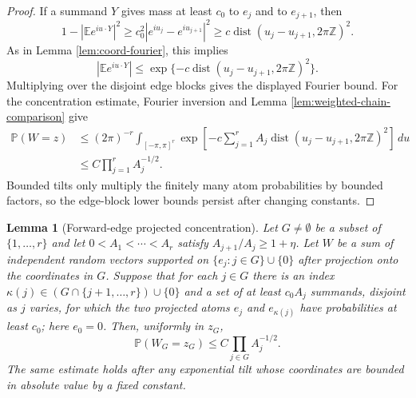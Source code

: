 \documentclass[11pt]{article}
\newtheorem{lemma}[theorem]{Lemma}
\theoremstyle{remark}
\newcommand{\Pp}{\mathbb P}
\newcommand{\Ee}{\mathbb E}
\newcommand{\dd}{\,d}
\begin{document}
\begin{proof}
If a summand $Y$ gives mass at least $c_0$ to $e_j$ and to $e_{j+1}$, then
\[
        1-|\Ee e^{iu\cdot Y}|^2
        \ge c_0^2|e^{iu_j}-e^{iu_{j+1}}|^2
        \ge c\operatorname{dist}(u_j-u_{j+1},2\pi\mathbb Z)^2 .
\]
As in Lemma \ref{lem:coord-fourier}, this implies
\[
        |\Ee e^{iu\cdot Y}|
        \le \exp\{-c\operatorname{dist}(u_j-u_{j+1},2\pi\mathbb Z)^2\}.
\]
Multiplying over the disjoint edge blocks gives the displayed Fourier bound.
For the concentration estimate, Fourier inversion and Lemma
\ref{lem:weighted-chain-comparison} give
\[
\begin{aligned}
        \Pp(W=z)
        &\le (2\pi)^{-r}\int_{[-\pi,\pi]^r}
        \exp\left[-c\sum_{j=1}^r A_j
        \operatorname{dist}(u_j-u_{j+1},2\pi\mathbb Z)^2\right]\dd u \\
        &\le C\prod_{j=1}^r A_j^{-1/2}.
\end{aligned}
\]
Bounded tilts only multiply the finitely many atom probabilities by bounded factors, so the edge-block lower bounds persist after changing constants.
\end{proof}

\begin{lemma}[Forward-edge projected concentration]\label{lem:projected-forward-edge-concentration}
Let $G\ne\emptyset$ be a subset of $\{1,\ldots,r\}$ and let
$0<A_1<\cdots<A_r$ satisfy $A_{j+1}/A_j\ge1+\eta$.
Let $W$ be a sum of independent random vectors supported on
$\{e_j:j\in G\}\cup\{0\}$ after projection onto the coordinates in $G$.
Suppose that for each $j\in G$ there is an index
$\kappa(j)\in (G\cap\{j+1,\ldots,r\})\cup\{0\}$ and a set of at
least $c_0A_j$ summands, disjoint as $j$ varies, for which the two
projected atoms $e_j$ and $e_{\kappa(j)}$ have probabilities at least
$c_0$; here $e_0=0$.  Then, uniformly in $z_G$,
\[
        \Pp(W_G=z_G)\le C\prod_{j\in G} A_j^{-1/2}.
\]
The same estimate holds after any exponential tilt whose coordinates are
bounded in absolute value by a fixed constant.
\end{lemma}
\end{document}
